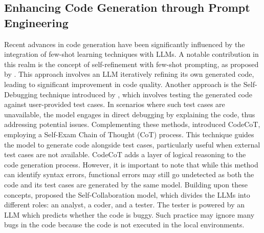 \documentclass{article}
\begin{document}
\subsection{Enhancing Code Generation through Prompt Engineering}
Recent advances in code generation have been significantly influenced by the integration of few-shot learning techniques with LLMs. A notable contribution in this realm is the concept of self-refinement with few-shot prompting, as proposed by \citet{Madaan2023SelfRefineIR}. This approach involves an LLM iteratively refining its own generated code, leading to significant improvement in code quality. Another approach is the Self-Debugging technique introduced by \citet{Chen2023TeachingLL}, which involves testing the generated code against user-provided test cases. In scenarios where such test cases are unavailable, the model engages in direct debugging by explaining the code, thus addressing potential issues. Complementing these methods, \citet{Huang2023CodeCoTAB} introduced CodeCoT, employing a Self-Exam Chain of Thought (CoT) process. This technique guides the model to generate code alongside test cases, particularly useful when external test cases are not available. CodeCoT adds a layer of logical reasoning to the code generation process. However, it is important to note that while this method can identify syntax errors, functional errors may still go undetected as both the code and its test cases are generated by the same model. Building upon these concepts, \citet{Dong2023SelfcollaborationCG} proposed the Self-Collaboration model, which divides the LLMs into different roles: an analyst, a coder, and a tester. The tester is powered by an LLM which predicts whether the code is buggy. Such practice may ignore many bugs in the code because the code is not executed in the local environments. 
\end{document}
